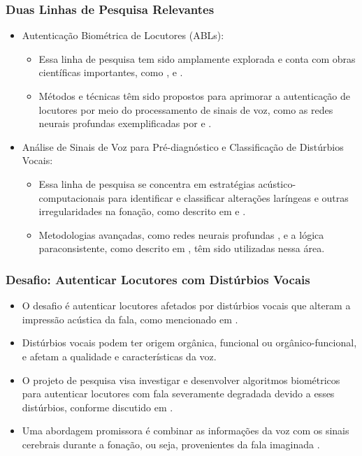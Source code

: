 \documentclass[aspectratio=169]{beamer}
\begin{document}
	\begin{frame}
		\frametitle{Duas Linhas de Pesquisa Relevantes}
		\begin{itemize}
			\item Autenticação Biométrica de Locutores (ABLs):
			\begin{itemize}
				\item Essa linha de pesquisa tem sido amplamente explorada e conta com obras científicas importantes, como \cite{furlan2021caracterizacao}, \cite{beigi2011speaker} e \cite{neustein2012forensic}.
				\item Métodos e técnicas têm sido propostos para aprimorar a autenticação de locutores por meio do processamento de sinais de voz, como as redes neurais profundas exemplificadas por \cite{mittal2021deep} e \cite{miliaresi2021combining}.
			\end{itemize}
			\item Análise de Sinais de Voz para Pré-diagnóstico e Classificação de Distúrbios Vocais:
			\begin{itemize}
				\item Essa linha de pesquisa se concentra em estratégias acústico-computacionais para identificar e classificar alterações laríngeas e outras irregularidades na fonação, como descrito em \cite{chaiani2022voice} e \cite{fujimura2022classification}.
				\item Metodologias avançadas, como redes neurais profundas \cite{goodfellow2016deep}, e a lógica paraconsistente, como descrito em \cite{fonseca2017linear}, têm sido utilizadas nessa área.
			\end{itemize}
		\end{itemize}
	\end{frame}
	
	\begin{frame}
		\frametitle{Desafio: Autenticar Locutores com Distúrbios Vocais}
		\begin{itemize}
			\item O desafio é autenticar locutores afetados por distúrbios vocais que alteram a impressão acústica da fala, como mencionado em \cite{le2005voz, le2005voz2}.
			\item Distúrbios vocais podem ter origem orgânica, funcional ou orgânico-funcional, e afetam a qualidade e características da voz.
			\item O projeto de pesquisa visa investigar e desenvolver algoritmos biométricos para autenticar locutores com fala severamente degradada devido a esses distúrbios, conforme discutido em \cite{gupta2021residual}.
			\item Uma abordagem promissora é combinar as informações da voz com os sinais cerebrais durante a fonação, ou seja, provenientes da fala imaginada \cite{moctezuma2019subjects}.
		\end{itemize}
	\end{frame}
	
\end{document}

